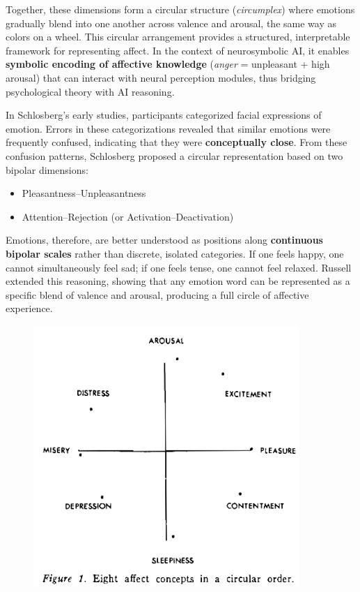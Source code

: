 \documentclass[12pt]{article}
\begin{document}
Together, these dimensions form a circular structure (\textit{circumplex}) where emotions gradually blend into one another across valence and arousal, the same way as colors on a wheel. This circular arrangement provides a structured, interpretable framework for representing affect. In the context of neurosymbolic AI, it enables \textbf{symbolic encoding of affective knowledge} (\textit{anger} = unpleasant + high arousal) that can interact with neural perception modules, thus bridging psychological theory with AI reasoning.

\vspace{1em}
\noindent
In Schlosberg’s early studies, participants categorized facial expressions of emotion. Errors in these categorizations revealed that similar emotions were frequently confused, indicating that they were \textbf{conceptually close}. From these confusion patterns, Schlosberg proposed a circular representation based on two bipolar dimensions:
\begin{itemize}
    \item Pleasantness–Unpleasantness
    \item Attention–Rejection (or Activation–Deactivation)
\end{itemize}
Emotions, therefore, are better understood as positions along \textbf{continuous bipolar scales} rather than discrete, isolated categories. If one feels happy, one cannot simultaneously feel sad; if one feels tense, one cannot feel relaxed. Russell extended this reasoning, showing that any emotion word can be represented as a specific blend of valence and arousal, producing a full circle of affective experience.

\begin{figure}[H]
    \centering
    \includegraphics[width=0.9\textwidth]{Media/affect8circle.png}
\end{figure}
\end{document}
